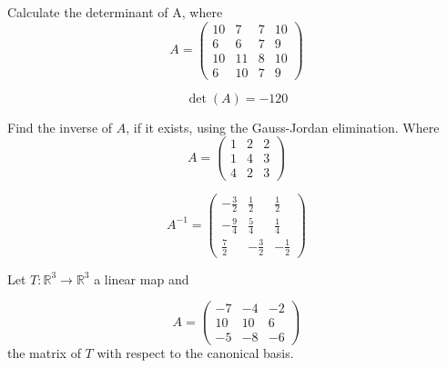 \begin{questions}

\question Calculate the determinant of A, where
$$
A=\left(\begin{array}{rrrr}
10 & 7 & 7 & 10 \\
6 & 6 & 7 & 9 \\
10 & 11 & 8 & 10 \\
6 & 10 & 7 & 9
\end{array}\right)
$$

\begin{solution}
$$\det(A)=-120$$
\end{solution}

\question Find the inverse of $A$, if it exists, using the Gauss-Jordan elimination. Where
$$
A=\left(\begin{array}{rrr}
1 & 2 & 2 \\
1 & 4 & 3 \\
4 & 2 & 3
\end{array}\right)
$$

\begin{solution}
$$A^{-1}=\left(\begin{array}{rrr}
-\frac{3}{2} & \frac{1}{2} & \frac{1}{2} \\
-\frac{9}{4} & \frac{5}{4} & \frac{1}{4} \\
\frac{7}{2} & -\frac{3}{2} & -\frac{1}{2}
\end{array}\right)$$
\end{solution}

\question Let $T:\mathbb{R}^3\rightarrow\mathbb{R}^3$  a linear map and
 
$$
A=\left(\begin{array}{rrr}
-7 & -4 & -2 \\
10 & 10 & 6 \\
-5 & -8 & -6
\end{array}\right)
$$
the matrix of $T$ with respect to the canonical basis.
\end{questions}
